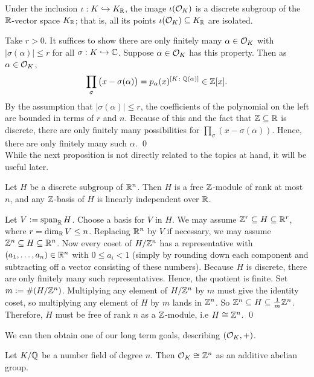 \begin{prop}
Under the inclusion $\iota: K \hookrightarrow K_{\mathbb{R}}$, the image $\iota(\mathcal{O}_K)$ is a discrete subgroup of the $\mathbb{R}$-vector space $K_{\mathbb{R}}$; that is, all its points $\iota(\mathcal{O}_K) \subseteq K_{\mathbb{R}}$ are isolated. 
\end{prop}

\pf Take $r>0$. It suffices to show there are only finitely many $\alpha \in \mathcal{O}_K$ with $|\sigma(\alpha)| \leq r$ for all $\sigma: K \hookrightarrow \mathbb{C}$. Suppose $\alpha \in \mathcal{O}_K$ has this property. Then as $\alpha \in \mathcal{O}_K$,
	\[
	\prod_\sigma \big(x - \sigma(\alpha) \big)= p_\alpha(x)^{[K \colon \mathbb{Q}(\alpha)]} \in \mathbb{Z}[x].
	\]
By the assumption that $|\sigma(\alpha)| \leq r$, the coefficients of the polynomial on the left are bounded in terms of $r$ and $n$. Because of this and the fact that $\mathbb{Z} \subseteq \mathbb{R}$ is discrete, there are only finitely many possibilities for $\prod_\sigma (x - \sigma(\alpha))$. Hence, there are only finitely many such $\alpha$. \qed \\


While the next proposition is not directly related to the topics at hand, it will be useful later.


\begin{prop}\label{prop:zbasis}
Let $H$ be a discrete subgroup of $\mathbb{R}^n$. Then $H$ is a free $\mathbb{Z}$-module of rank at most $n$, and any $\mathbb{Z}$-basis of $H$ is linearly independent over $\mathbb{R}$. 
\end{prop}

\pf Let $V:= \operatorname{span}_{\mathbb{R}} H$. Choose a basis for $V$ in $H$. We may assume $\mathbb{Z}^r \subseteq H \subseteq \mathbb{R}^r$, where $r= \dim_{\mathbb{R}} V \leq n$. Replacing $\mathbb{R}^n$ by $V$ if necessary, we may assume $\mathbb{Z}^n \subseteq H \subseteq \mathbb{R}^n$. Now every coset of $H/\mathbb{Z}^n$ has a representative with $(a_1, \ldots, a_n) \in \mathbb{R}^n$ with $0 \leq a_i<1$ (simply by rounding down each component and subtracting off a vector consisting of these numbers). Because $H$ is discrete, there are only finitely many such representatives. Hence, the quotient is finite. Set $m:= \#(H/\mathbb{Z}^n)$. Multiplying any element of $H/\mathbb{Z}^n$ by $m$ must give the identity coset, so multiplying any element of $H$ by $m$ lands in $\mathbb{Z}^n$. So $\mathbb{Z}^n \subseteq H \subseteq \frac{1}{m} \mathbb{Z}^n$. Therefore, $H$ must be free of rank $n$ as a $\mathbb{Z}$-module, i.e $H \cong \mathbb{Z}^n$. \qed \pskip


We can then obtain one of our long term goals, describing $(\mathcal{O}_K,+)$.


\begin{prop} \label{prop:ringintabelian}
Let $K/\mathbb{Q}$ be a number field of degree $n$. Then $\mathcal{O}_K \cong \mathbb{Z}^n$ as an additive abelian group.
\end{prop}


